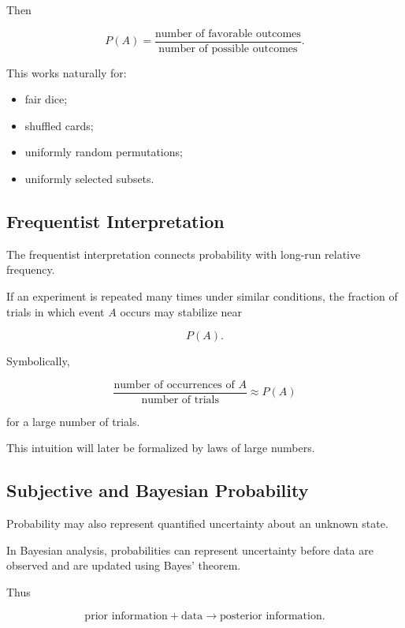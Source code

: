 Then

\[
\boxed{
P(A)
=
\frac{
\text{number of favorable outcomes}
}{
\text{number of possible outcomes}
}.
}
\]

This works naturally for:

\begin{itemize}
    \item fair dice;
    \item shuffled cards;
    \item uniformly random permutations;
    \item uniformly selected subsets.
\end{itemize}

\subsection{Frequentist Interpretation}
\label{subsec:frequentist-probability}

The frequentist interpretation connects probability with long-run
relative frequency.

If an experiment is repeated many times under similar conditions, the
fraction of trials in which event \(A\) occurs may stabilize near

\[
P(A).
\]

Symbolically,

\[
\boxed{
\frac{
\text{number of occurrences of }A
}{
\text{number of trials}
}
\approx
P(A)
}
\]

for a large number of trials.

This intuition will later be formalized by laws of large numbers.

\subsection{Subjective and Bayesian Probability}
\label{subsec:subjective-bayesian-probability}

Probability may also represent quantified uncertainty about an unknown
state.

In Bayesian analysis, probabilities can represent uncertainty before
data are observed and are updated using Bayes' theorem.

Thus

\[
\boxed{
\text{prior information}
+
\text{data}
\longrightarrow
\text{posterior information}.
}
\]

